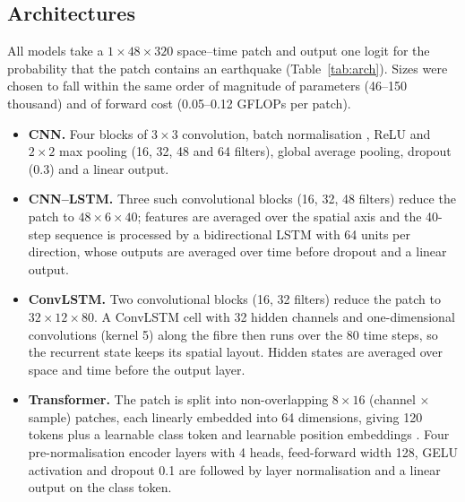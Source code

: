 \subsection*{Architectures}
All models take a $1\times48\times320$ space--time patch and output one logit for the probability that the patch contains an earthquake (Table~\ref{tab:arch}). Sizes were chosen to fall within the same order of magnitude of parameters (46--150 thousand) and of forward cost (0.05--0.12 GFLOPs per patch).
\begin{itemize}
\item \textbf{CNN.} Four blocks of $3\times3$ convolution, batch normalisation \citep{Ioffe2015}, ReLU and $2\times2$ max pooling (16, 32, 48 and 64 filters), global average pooling, dropout (0.3) and a linear output.
\item \textbf{CNN--LSTM.} Three such convolutional blocks (16, 32, 48 filters) reduce the patch to $48\times6\times40$; features are averaged over the spatial axis and the 40-step sequence is processed by a bidirectional LSTM with 64 units per direction, whose outputs are averaged over time before dropout and a linear output.
\item \textbf{ConvLSTM.} Two convolutional blocks (16, 32 filters) reduce the patch to $32\times12\times80$. A ConvLSTM cell \citep{Shi2015} with 32 hidden channels and one-dimensional convolutions (kernel 5) along the fibre then runs over the 80 time steps, so the recurrent state keeps its spatial layout. Hidden states are averaged over space and time before the output layer.
\item \textbf{Transformer.} The patch is split into non-overlapping $8\times16$ (channel $\times$ sample) patches, each linearly embedded into 64 dimensions, giving 120 tokens plus a learnable class token and learnable position embeddings \citep{Dosovitskiy2021}. Four pre-normalisation encoder layers \citep{Vaswani2017} with 4 heads, feed-forward width 128, GELU activation and dropout 0.1 are followed by layer normalisation and a linear output on the class token.
\end{itemize}

